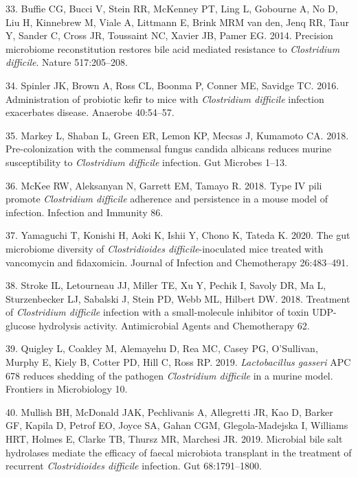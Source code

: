 \documentclass[
  11pt,
]{article}
\begin{document}
\leavevmode\hypertarget{ref-Buffie2014}{}%
33. Buffie CG, Bucci V, Stein RR, McKenney PT, Ling L, Gobourne A, No D,
Liu H, Kinnebrew M, Viale A, Littmann E, Brink MRM van den, Jenq RR,
Taur Y, Sander C, Cross JR, Toussaint NC, Xavier JB, Pamer EG. 2014.
Precision microbiome reconstitution restores bile acid mediated
resistance to \emph{Clostridium difficile}. Nature 517:205--208.

\leavevmode\hypertarget{ref-Spinler2016}{}%
34. Spinler JK, Brown A, Ross CL, Boonma P, Conner ME, Savidge TC. 2016.
Administration of probiotic kefir to mice with \emph{Clostridium
difficile} infection exacerbates disease. Anaerobe 40:54--57.

\leavevmode\hypertarget{ref-Markey2018}{}%
35. Markey L, Shaban L, Green ER, Lemon KP, Mecsas J, Kumamoto CA. 2018.
Pre-colonization with the commensal fungus candida albicans reduces
murine susceptibility to \emph{Clostridium difficile} infection. Gut
Microbes 1--13.

\leavevmode\hypertarget{ref-McKee2018}{}%
36. McKee RW, Aleksanyan N, Garrett EM, Tamayo R. 2018. Type IV pili
promote \emph{Clostridium difficile} adherence and persistence in a
mouse model of infection. Infection and Immunity 86.

\leavevmode\hypertarget{ref-Yamaguchi2020}{}%
37. Yamaguchi T, Konishi H, Aoki K, Ishii Y, Chono K, Tateda K. 2020.
The gut microbiome diversity of \emph{Clostridioides
difficile}-inoculated mice treated with vancomycin and fidaxomicin.
Journal of Infection and Chemotherapy 26:483--491.

\leavevmode\hypertarget{ref-Stroke2018}{}%
38. Stroke IL, Letourneau JJ, Miller TE, Xu Y, Pechik I, Savoly DR, Ma
L, Sturzenbecker LJ, Sabalski J, Stein PD, Webb ML, Hilbert DW. 2018.
Treatment of \emph{Clostridium difficile} infection with a
small-molecule inhibitor of toxin UDP-glucose hydrolysis activity.
Antimicrobial Agents and Chemotherapy 62.

\leavevmode\hypertarget{ref-Quigley2019}{}%
39. Quigley L, Coakley M, Alemayehu D, Rea MC, Casey PG, O'Sullivan,
Murphy E, Kiely B, Cotter PD, Hill C, Ross RP. 2019. \emph{Lactobacillus
gasseri} APC 678 reduces shedding of the pathogen \emph{Clostridium
difficile} in a murine model. Frontiers in Microbiology 10.

\leavevmode\hypertarget{ref-Mullish2019}{}%
40. Mullish BH, McDonald JAK, Pechlivanis A, Allegretti JR, Kao D,
Barker GF, Kapila D, Petrof EO, Joyce SA, Gahan CGM, Glegola-Madejska I,
Williams HRT, Holmes E, Clarke TB, Thursz MR, Marchesi JR. 2019.
Microbial bile salt hydrolases mediate the efficacy of faecal microbiota
transplant in the treatment of recurrent \emph{Clostridioides difficile}
infection. Gut 68:1791--1800.
\end{document}
